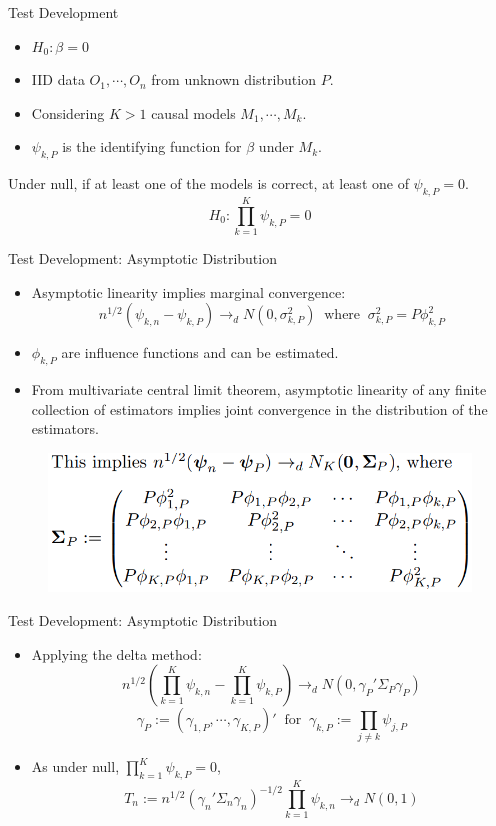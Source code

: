 \documentclass{beamer}
\begin{document}
\begin{frame}{Test Development}
	\begin{itemize}
		\item $H_{0}: \beta = 0 $
		\item IID data $ O_1, \cdots, O_n $ from unknown distribution $ P $.
		\item Considering $ K > 1 $ causal models $ M_1, \cdots, M_k $.
		\item $ \psi_{k, P} $ is the identifying function for $ \beta $ under $ M_k $.
	\end{itemize}

	\vspace{2em}

	Under null, if at least one of the models is correct, at least one of $ \psi_{k, P} = 0 $.
	$$ H_0: \prod_{k=1}^{K} \psi_{k, P} = 0 $$
\end{frame}

\begin{frame}{Test Development: Asymptotic Distribution}
	\begin{itemize}
		\item Asymptotic linearity implies marginal convergence:
			$$ n^{1/2}(\psi_{k,n} - \psi_{k, P}) \rightarrow_d N(0, \sigma^2_{k, P}) \;\; \textrm{where} \;\; \sigma^2_{k, P} = P \phi^2_{k, P} $$
		\item $ \phi_{k,P} $ are influence functions and can be estimated.
		\item From multivariate central limit theorem, asymptotic linearity of any finite collection of estimators implies joint convergence in the distribution of the estimators.
	\end{itemize}
	\begin{figure}
		\includegraphics[scale=0.3]{matrix.png}
	\end{figure}
\end{frame}

\begin{frame}{Test Development: Asymptotic Distribution}
	\begin{itemize}
		\item Applying the delta method:
			$$ n^{1/2}(\prod_{k=1}^{K} \psi_{k,n} - \prod_{k=1}^{K} \psi_{k,P}) \rightarrow_d N(0, \gamma_P' \Sigma_P \gamma_P) $$
			$$ \gamma_P := (\gamma_{1, P}, \cdots, \gamma_{K,P})' \; \; \textrm{for} \; \; \gamma_{k, P} := \prod_{j \ne k} \psi_{j, P} $$
			
		\item As under null, $ \prod_{k=1}^{K} \psi_{k, P} = 0 $,
			$$ T_n := n^{1/2}(\gamma_n' \Sigma_n \gamma_n)^{-1/2} \prod_{k=1}^{K} \psi_{k, n} \rightarrow_d N(0, 1) $$
	\end{itemize}
\end{frame}
\end{document}
